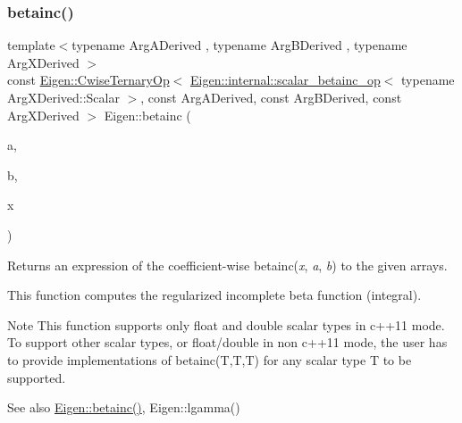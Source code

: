 \mbox{\label{namespace_eigen_a81f796c95561b9847eb8a6b8ccfa3e7d}} 
\subsubsection{\texorpdfstring{betainc()}{betainc()}\hspace{0.1cm}{\footnotesize\ttfamily [2/2]}}
{\footnotesize\ttfamily template$<$typename Arg\+A\+Derived , typename Arg\+B\+Derived , typename Arg\+X\+Derived $>$ \\
const \hyperlink{group___core___module_class_eigen_1_1_cwise_ternary_op}{Eigen\+::\+Cwise\+Ternary\+Op}$<$ \hyperlink{struct_eigen_1_1internal_1_1scalar__betainc__op}{Eigen\+::internal\+::scalar\+\_\+betainc\+\_\+op}$<$ typename Arg\+X\+Derived\+::\+Scalar $>$, const Arg\+A\+Derived, const Arg\+B\+Derived, const Arg\+X\+Derived $>$ Eigen\+::betainc (\begin{DoxyParamCaption}\item[{const \hyperlink{group___core___module_class_eigen_1_1_array_base}{Eigen\+::\+Array\+Base}$<$ Arg\+A\+Derived $>$ \&}]{a,  }\item[{const \hyperlink{group___core___module_class_eigen_1_1_array_base}{Eigen\+::\+Array\+Base}$<$ Arg\+B\+Derived $>$ \&}]{b,  }\item[{const \hyperlink{group___core___module_class_eigen_1_1_array_base}{Eigen\+::\+Array\+Base}$<$ Arg\+X\+Derived $>$ \&}]{x }\end{DoxyParamCaption})\hspace{0.3cm}{\ttfamily [inline]}}

\begin{DoxyReturn}{Returns}
an expression of the coefficient-\/wise betainc({\itshape x}, {\itshape a}, {\itshape b}) to the given arrays.
\end{DoxyReturn}
This function computes the regularized incomplete beta function (integral).

\begin{DoxyNote}{Note}
This function supports only float and double scalar types in c++11 mode. To support other scalar types, or float/double in non c++11 mode, the user has to provide implementations of betainc(\+T,\+T,\+T) for any scalar type T to be supported.
\end{DoxyNote}
\begin{DoxySeeAlso}{See also}
\hyperlink{namespace_eigen_a726eae91d4e91d8e25cbe55fffa6a92f}{Eigen\+::betainc()}, Eigen\+::lgamma() 
\end{DoxySeeAlso}


